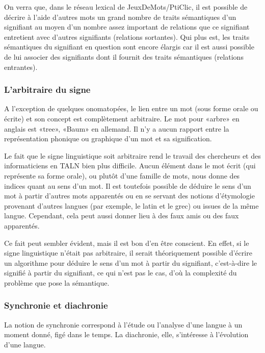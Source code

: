 \documentclass[a4paper,11pt,french]{article}
\begin{document}
On verra que, dans le réseau lexical de JeuxDeMots/PtiClic, il est possible de décrire à l'aide d'autres mots un grand nombre de traits sémantiques d'un signifiant au moyen d'un nombre assez important de relations que ce signifiant entretient avec d'autres signifiants (relations sortantes). Qui plus est, les traits sémantiques du signifiant en question sont encore élargis car il est aussi possible de lui associer des signifiants dont il fournit des traits sémantiques (relations entrantes). 

\subsubsection{L'arbitraire du signe}

A l'exception de quelques onomatopées, le lien entre un mot (sous forme orale ou écrite) et son concept est complètement arbitraire. Le mot pour «arbre» en anglais est «tree», «Baum» en allemand. Il n'y a aucun rapport entre la représentation phonique ou graphique d'un mot et sa signification.

Le fait que le signe linguistique soit arbitraire rend le travail des chercheurs et des informaticiens en TALN bien plus difficile. Aucun élément dans le mot écrit (qui représente sa forme orale), ou plutôt d'une famille de mots, nous donne des indices quant au sens d'un mot. Il est toutefois possible de déduire le sens d'un mot à partir d'autres mots apparentés ou en se servant des notions d'étymologie provenant d'autres langues (par exemple, le latin et le grec) ou issues de la même langue. Cependant, cela peut aussi donner lieu à des faux amis ou des faux apparentés. 

Ce fait peut sembler évident, mais il est bon d'en être conscient. En effet, si le signe linguistique n'était pas arbitraire, il serait théoriquement possible d'écrire un algorithme pour déduire le sens d'un mot à partir du signifiant, c'est-à-dire le signifié à partir du signifiant, ce qui n'est pas le cas, d'où la complexité du problème que pose la sémantique. 


\subsubsection{Synchronie et diachronie}

La notion de synchronie correspond à l'étude ou l'analyse d'une langue à un moment donné, figé dans le temps. La diachronie, elle, s'intéresse à l'évolution d'une langue.
\end{document}
